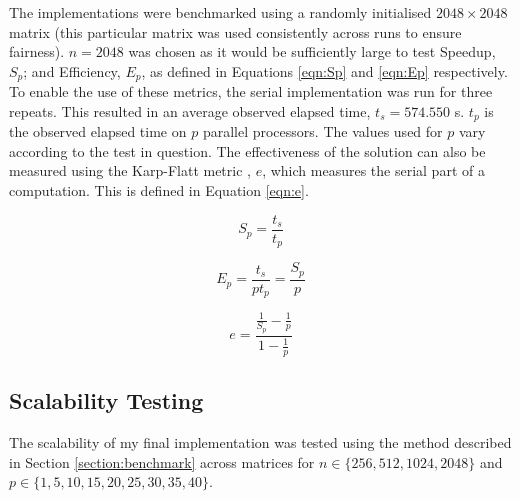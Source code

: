 The implementations were benchmarked using a randomly initialised $2048\times2048$ matrix (this particular matrix was used consistently across runs to ensure fairness). $n=2048$ was chosen as it would be sufficiently large to test Speedup, $S_p$; and Efficiency, $E_p$, as defined in Equations \ref{eqn:Sp} and \ref{eqn:Ep} respectively. To enable the use of these metrics, the serial implementation was run for three repeats. This resulted in an average observed elapsed time, $t_s=574.550$ s. $t_p$ is the observed elapsed time on $p$ parallel processors. The values used for $p$ vary according to the test in question. The effectiveness of the solution can also be measured using the Karp-Flatt metric \cite{10.1145/78607.78614}, $e$, which measures the serial part of a computation. This is defined in Equation \ref{eqn:e}.

\begin{equation} \label{eqn:Sp}
S_p = \frac{t_s}{t_p}
\end{equation}

\begin{equation} \label{eqn:Ep}
E_p = \frac{t_s}{pt_p} = \frac{S_p}{p}
\end{equation}

\begin{equation} \label{eqn:e}
e = \frac{\frac{1}{S_p}-\frac{1}{p}}{1-\frac{1}{p}}
\end{equation}

\subsection{Scalability Testing}

The scalability of my final implementation was tested using the method described in Section \ref{section:benchmark} across matrices for $n\in\{256, 512, 1024, 2048\}$ and $p\in\{1, 5, 10, 15, 20, 25, 30, 35, 40\}$.
